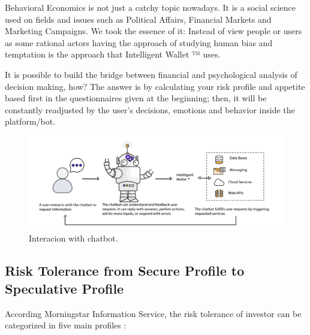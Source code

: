 \documentclass[	DIV=calc,%
							paper=letter,%
							fontsize=12pt%
                            ]{scrartcl}	 					%
\begin{document}
Behavioral Economics is not just a catchy topic nowadays. It is a social science used on fields and issues such as Political Affairs, Financial Markets and Marketing Campaigns. We took the essence of it: Instead of view people or users as some rational actors having the approach of studying human bias and temptation is the approach that Intelligent Wallet ™ uses.

It is possible to build the bridge between financial and psychological analysis of decision making, how? The answer is by calculating your risk profile and appetite based first in the questionnaires given at the beginning; then, it will be constantly readjusted by the user's decisions, emotions and behavior inside the platform/bot.

\begin{figure}[H]
\centering
\includegraphics[scale=0.4]{img/Chatbot.png}
\caption{Interacion with chatbot.}
\label{Chatbot}
\end{figure}

\subsection{\label{sec:level1}Risk Tolerance from Secure Profile to Speculative Profile}
According Morningstar Information Service, the risk tolerance of investor can be categorized in five main profiles \cite{currentreport_risktolerancequest}:
\end{document}
